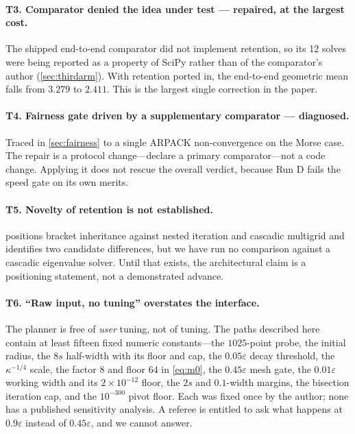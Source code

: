 \documentclass[twocolumn,10pt,a4paper]{article}
\theoremstyle{plain}
\theoremstyle{definition}
\newcommand{\eps}{\varepsilon}
\begin{document}
\paragraph{T3. Comparator denied the idea under test ---
\textbf{repaired}, at the largest cost.} The shipped end-to-end comparator did
not implement retention, so its 12 solves were being reported as a property of
SciPy rather than of the comparator's author (\cref{sec:thirdarm}). With
retention ported in, the end-to-end geometric mean falls from $3.279$ to
$2.411$. This is the largest single correction in the paper.

\paragraph{T4. Fairness gate driven by a supplementary comparator ---
\textbf{diagnosed}.} Traced in \cref{sec:fairness} to a single ARPACK
non-convergence on the Morse case. The repair is a protocol change---declare a
primary comparator---not a code change. Applying it does not rescue the overall
verdict, because Run D fails the speed gate on its own merits.

\paragraph{T5. Novelty of retention is not established.}
 positions bracket inheritance against nested iteration and
cascadic multigrid \citep{bornemann1996,trottenberg2001} and identifies two
candidate differences, but we have run no comparison against a cascadic
eigenvalue solver. Until that exists, the architectural claim is a positioning
statement, not a demonstrated advance.

\paragraph{T6. ``Raw input, no tuning'' overstates the interface.}
The planner is free of \emph{user} tuning, not of tuning. The paths described
here contain at least fifteen fixed numeric constants---the $1025$-point probe,
the initial radius, the $8s$ half-width with its floor and cap, the $0.05\eps$
decay threshold, the $\kappa^{-1/4}$ scale, the factor $8$ and floor $64$ in
\eqref{eq:m0}, the $0.45\eps$ mesh gate, the $0.01\eps$ working width and its
$2\times10^{-12}$ floor, the $2s$ and $0.1$-width margins, the bisection
iteration cap, and the $10^{-300}$ pivot floor. Each was fixed once by the
author; none has a published sensitivity analysis. A referee is entitled to ask
what happens at $0.9\eps$ instead of $0.45\eps$, and we cannot answer.
\end{document}
